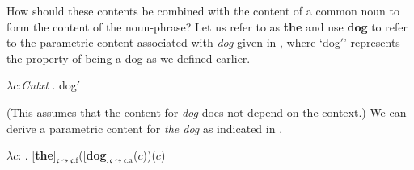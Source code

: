 How should these contents be combined with the content of a common noun
to form the content of the noun-phrase?  Let us refer to \preveg{} as
\textbf{the} and use \textbf{dog} to refer to the parametric content
associated with \textit{dog} given in \nexteg{}, where `dog$'$'
represents the property of being a dog as we defined earlier.
\begin{ex} 
  $\lambda c$:\textit{Cntxt} . dog$'$ 
\end{ex} 
(This assumes that the content for \textit{dog} does not depend on the
context.)  We can derive a parametric content for \textit{the dog} as
indicated in \nexteg{}.



\begin{ex}
  $\lambda c$:
  . [\textbf{the}]$_{\mathfrak{c}\leadsto\mathfrak{c}.\text{f}}$([\textbf{dog}]$_{\mathfrak{c}\leadsto\mathfrak{c}.\text{a}}$($c$))($c$)
  
\end{ex}

